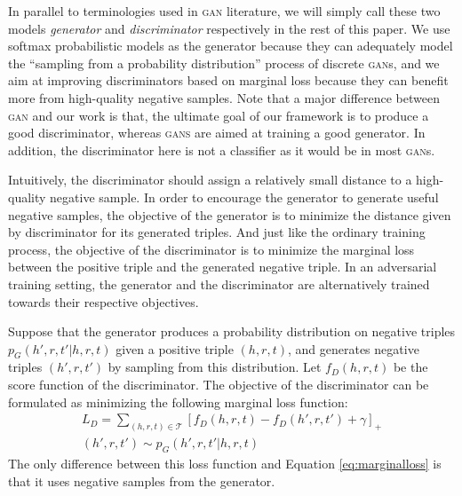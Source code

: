 \documentclass[11pt,a4paper]{article}
\begin{document}
In parallel to terminologies used in \textsc{gan} literature, we will simply call these two models \emph{generator} and \emph{discriminator} respectively in the rest of this paper. We use softmax probabilistic models as the generator because they can adequately model the ``sampling from a probability distribution'' process of discrete \textsc{gan}s, and we aim at improving discriminators based on marginal loss because they can benefit more from high-quality negative samples. Note that a major difference between \textsc{gan} and our work is that, the ultimate goal of our framework is to produce a good discriminator, whereas \textsc{gans} are aimed at training a good generator. In addition, the discriminator here is not a classifier as it would be in most \textsc{gan}s. 

Intuitively, the discriminator should assign a relatively small distance to a high-quality negative sample. In order to encourage the generator to generate useful negative samples, the objective of the generator is to minimize the distance given by discriminator for its generated triples. And just like the ordinary training process, the objective of the discriminator is to minimize the marginal loss between the positive triple and the generated negative triple. In an adversarial training setting, the generator and the discriminator are alternatively trained towards their respective objectives.

Suppose that the generator produces a probability distribution on negative triples $p_G(h',r,t'|h,r,t)$ given a positive triple $(h,r,t)$, and generates negative triples $(h',r,t')$ by sampling from this distribution. Let $f_D(h,r,t)$ be the score function of the discriminator. The objective of the discriminator can be formulated as minimizing the following marginal loss function:
\begin{multline}
L_D=\sum_{(h,r,t)\in\mathcal{T}}[f_D(h,r,t)-f_D(h',r,t')+\gamma]_+ \\
(h',r,t')\sim p_G(h',r,t'|h,r,t)
\end{multline}
The only difference between this loss function and Equation \ref{eq:marginalloss} is that it uses negative samples from the generator.
\end{document}

